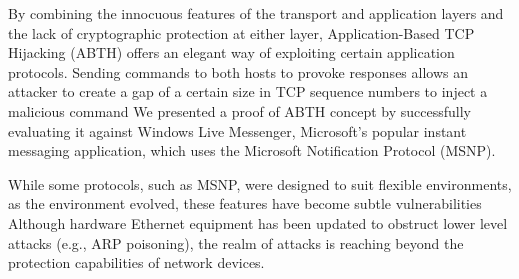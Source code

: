\documentclass{sig-alternate}
\begin{document}
By combining the innocuous features of the transport and application layers and the lack of cryptographic protection at either layer, Application-Based TCP Hijacking (ABTH) offers an elegant way of exploiting certain application protocols.
Sending commands to both hosts to provoke responses allows an attacker to create a gap of a certain size in TCP sequence numbers to inject a malicious command
We presented a proof of ABTH concept by successfully evaluating it against Windows Live Messenger, Microsoft's popular instant messaging application, which uses the Microsoft Notification Protocol (MSNP).

While some protocols, such as MSNP, were designed to suit flexible environments, as the environment evolved, these features have become subtle vulnerabilities
Although hardware Ethernet equipment has been updated to obstruct lower level attacks (e.g., ARP poisoning), the realm of attacks is reaching beyond the protection capabilities of network devices.



\end{document}
